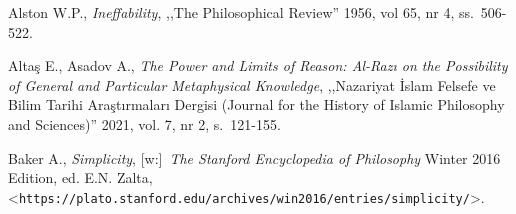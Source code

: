 \begin{thebibliography}{100}

\providecommand{\url}[1]{\texttt{#1}}
\providecommand{\urlprefix}{URL }
\providecommand{\selectlanguage}[1]{\relax}
%
\newcommand{\Capitalize}[1]{\uppercase{#1}}
\newcommand{\capitalize}[1]{\expandafter\Capitalize#1}
\providecommand{\bibAnnoteFile}[1]{%
  \IfFileExists{#1}{\begin{quotation}\noindent\textsc{Key:} #1\\
  \textsc{Annotation:}\ \end{quotation}}{}}
\providecommand{\bibAnnote}[2]{%
  \begin{quotation}\noindent\textsc{Key:} #1\\
  \textsc{Annotation:}\ #2\end{quotation}}


Alston W.P., \textit{Ineffability}, ,,The Philosophical Review'' 1956, vol 65, nr 4, ss.~506-522.

Altaş E., Asadov A., \textit{The Power and Limits of Reason: Al-Razı on the Possibility of General and Particular Metaphysical Knowledge},
,,Nazariyat İslam Felsefe ve Bilim Tarihi Araştırmaları Dergisi (Journal for the History of Islamic Philosophy and Sciences)'' 2021, vol. 7, nr 2, s.~121-155.



Baker A., \textit{Simplicity}, [w:]~\textit{The Stanford Encyclopedia of Philosophy}
Winter 2016 Edition, ed. E.N. Zalta, {\textless}\url{https://plato.stanford.edu/archives/win2016/entries/simplicity/}{\textgreater}.


\end{thebibliography}
